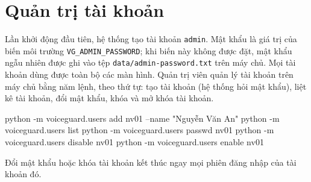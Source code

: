 \documentclass[11pt]{article}
\begin{document}
\section{Quản trị tài khoản}

Lần khởi động đầu tiên, hệ thống tạo tài khoản \texttt{admin}. Mật khẩu là giá trị của biến môi trường \texttt{VG\_\allowbreak ADMIN\_\allowbreak PASSWORD}; khi biến này không được đặt, mật khẩu ngẫu nhiên được ghi vào tệp \texttt{data/\allowbreak admin-password.txt} trên máy chủ. Mọi tài khoản dùng được toàn bộ các màn hình. Quản trị viên quản lý tài khoản trên máy chủ bằng năm lệnh, theo thứ tự: tạo tài khoản (hệ thống hỏi mật khẩu), liệt kê tài khoản, đổi mật khẩu, khóa và mở khóa tài khoản.

\begin{code}
python -m voiceguard.users add nv01 --name "Nguyễn Văn An"
python -m voiceguard.users list
python -m voiceguard.users passwd nv01
python -m voiceguard.users disable nv01
python -m voiceguard.users enable nv01
\end{code}

Đổi mật khẩu hoặc khóa tài khoản kết thúc ngay mọi phiên đăng nhập của tài khoản đó.
\end{document}
